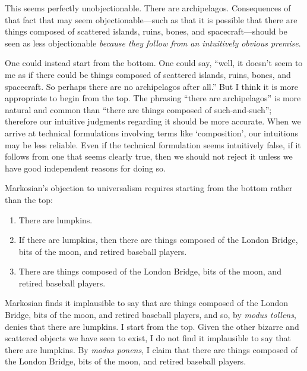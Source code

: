 \documentclass[11pt]{article}
\begin{document}
\begin{spacing}{1.25}
This seems perfectly unobjectionable.  There are archipelagos.
Consequences of that fact that may seem objectionable---such as that
it is possible that there are things composed of scattered islands,
ruins, bones, and spacecraft---should be seen as less objectionable
{\em because they follow from an intuitively obvious premise}.

One could instead start from the bottom.  One could say, ``well, it
doesn't seem to me as if there could be things composed of scattered
islands, ruins, bones, and spacecraft.  So perhaps there are no
archipelagos after all.''  But I think it is more appropriate to begin
from the top.  The phrasing ``there are archipelagos'' is more natural
and common than ``there are things composed of such-and-such'';
therefore our intuitive judgments regarding it should be more
accurate.  When we arrive at technical formulations involving terms
like `composition', our intuitions may be less reliable.  Even if the
technical formulation seems intuitively false, if it follows from one
that seems clearly true, then we should not reject it unless we have
good independent reasons for doing so.

Markosian's objection to universalism requires starting from the
bottom rather than the top:

\begin{enumerate}
  \item There are lumpkins.
  \item If there are lumpkins, then there are things composed of the
    London Bridge, bits of the moon, and retired baseball players.
  \item There are things composed of the London Bridge, bits of the
    moon, and retired baseball players.
\end{enumerate}

Markosian finds it implausible to say that are things composed of the
London Bridge, bits of the moon, and retired baseball players, and so,
by {\em modus tollens}, denies that there are lumpkins.  I start from
the top.  Given the other bizarre and scattered objects we have seen
to exist, I do not find it implausible to say that there are lumpkins.
By {\em modus ponens}, I claim that there are things composed of the
London Bridge, bits of the moon, and retired baseball players.


\end{spacing}
\end{document}
